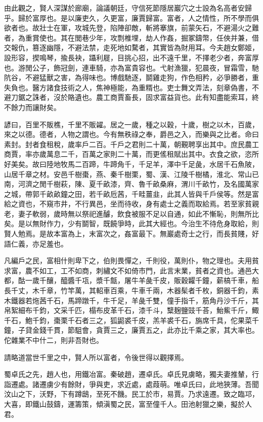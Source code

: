 由此觀之，賢人深謀於廊廟，論議朝廷，守信死節隱居巖穴之士設為名高者安歸乎。歸於富厚也。是以廉吏久，久更富，廉賈歸富。富者，人之情性，所不學而俱欲者也。故壯士在軍，攻城先登，陷陣卻敵，斬將搴旗，前蒙矢石，不避湯火之難者，為重賞使也。其在閭巷少年，攻剽椎埋，劫人作姦，掘冢鑄幣，任俠并兼，借交報仇，篡逐幽隱，不避法禁，走死地如騖者，其實皆為財用耳。今夫趙女鄭姬，設形容，揳鳴琴，揄長袂，躡利屣，目挑心招，出不遠千里，不擇老少者，奔富厚也。游閒公子，飾冠劍，連車騎，亦為富貴容也。弋射漁獵，犯晨夜，冒霜雪，馳阬谷，不避猛獸之害，為得味也。博戲馳逐，鬬雞走狗，作色相矜，必爭勝者，重失負也。醫方諸食技術之人，焦神極能，為重糈也。吏士舞文弄法，刻章偽書，不避刀鋸之誅者，沒於賂遺也。農工商賈畜長，固求富益貨也。此有知盡能索耳，終不餘力而讓財矣。

諺曰，百里不販樵，千里不販糴。居之一歲，種之以穀，十歲，樹之以木，百歲，來之以德。德者，人物之謂也。今有無秩祿之奉，爵邑之入，而樂與之比者。命曰素封。封者食租稅，歲率戶二百。千戶之君則二十萬，朝覲聘享出其中。庶民農工商賈，率亦歲萬息二千，百萬之家則二十萬，而更傜租賦出其中。衣食之欲，恣所好美矣。故曰陸地牧馬二百蹄，牛蹄角千，千足羊，澤中千足彘，水居千石魚陂，山居千章之材。安邑千樹棗，燕、秦千樹栗，蜀、漢、江陵千樹橘，淮北、常山已南，河濟之閒千樹萩，陳、夏千畝漆，齊、魯千畝桑麻，渭川千畝竹，及名國萬家之城，帶郭千畝畝鐘之田，若千畝卮茜，千畦薑韭，此其人皆與千戶侯等。然是富給之資也，不窺市井，不行異邑，坐而待收，身有處士之義而取給焉。若至家貧親老，妻子軟弱，歲時無以祭祀進醵，飲食被服不足以自通，如此不慚恥，則無所比矣。是以無財作力，少有鬬智，既饒爭時，此其大經也。今治生不待危身取給，則賢人勉焉。是故本富為上，末富次之，姦富最下。無巖處奇士之行，而長貧賤，好語仁義，亦足羞也。

凡編戶之民，富相什則卑下之，伯則畏憚之，千則役，萬則仆，物之理也。夫用貧求富，農不如工，工不如商，刺繡文不如倚市門，此言末業，貧者之資也。通邑大都，酤一歲千釀，醯醬千瓨，漿千甔，屠牛羊彘千皮，販穀糶千鐘，薪槁千車，船長千丈，木千章，竹竿萬，其軺車百乘，牛車千兩，木器髤者千枚，銅器千鈞，素木鐵器若炧茜千石，馬蹄蹾千，牛千足，羊彘千雙，僮手指千，筋角丹沙千斤，其帛絮細布千鈞，文采千匹，榻布皮革千石，漆千斗，糱麹鹽豉千荅，鮐鮆千斤，鯫千石，鮑千鈞，棗栗千石者三之，狐鼦裘千皮，羔羊裘千石，旃席千具，佗果菜千鐘，子貸金錢千貫，節駔會，貪賈三之，廉賈五之，此亦比千乘之家，其大率也。佗雜業不中什二，則非吾財也。

請略道當世千里之中，賢人所以富者，令後世得以觀擇焉。

蜀卓氏之先，趙人也，用鐵冶富。秦破趙，遷卓氏。卓氏見虜略，獨夫妻推輦，行詣遷處。諸遷虜少有餘財，爭與吏，求近處，處葭萌。唯卓氏曰，此地狹薄。吾聞汶山之下，沃野，下有蹲鴟，至死不饑。民工於市，易賈。乃求遠遷。致之臨邛，大喜，即鐵山鼓鑄，運籌策，傾滇蜀之民，富至僮千人。田池射獵之樂，擬於人君。

